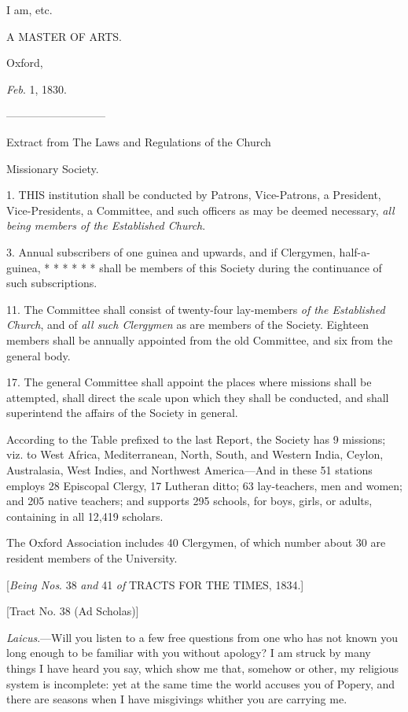 I am, etc.

A MASTER OF
ARTS.

Oxford,

\emph{Feb}. 1, 1830.

—————————

Extract from The Laws and Regulations of the
Church

Missionary Society.

1. THIS
institution shall be conducted by Patrons, Vice-Patrons, a President,
Vice-Presidents, a Committee, and such officers as may be deemed
necessary, \emph{all being members of the Established Church}.

3. Annual subscribers of one guinea and upwards,
and if Clergymen, half-a-guinea, * *
*
*
*
* shall be members of this Society during the continuance of such
subscriptions.

11. The Committee shall consist of twenty-four
lay-members \emph{of the Established Church}, and of \emph{all such
Clergymen} as are members of the Society. Eighteen members shall be
annually appointed from the old Committee, and six from the general
body.

17. The general Committee shall appoint the
places where missions shall be attempted, shall direct the scale upon
which they shall be conducted, and shall superintend the affairs
of the Society in general.

According to the Table prefixed to the last
Report, the Society has 9 missions; viz. to West Africa,
Mediterranean, North, South, and Western India, Ceylon, Australasia,
West Indies, and Northwest America—And in these 51 stations employs
28 Episcopal Clergy, 17 Lutheran ditto; 63 lay-teachers, men and
women; and 205 native teachers; and supports 295 schools, for boys,
girls, or adults, containing in all 12,419 scholars.

The Oxford Association includes 40 Clergymen, of
which number about 30 are resident members of the University.


[\emph{Being
Nos}. 38 \emph{and} 41 \emph{of} TRACTS
FOR THE
TIMES, 1834.]

[Tract No. 38 (Ad Scholas)]


\emph{Laicus}.—Will you listen to a few
free questions from one who has not known you long enough to be
familiar with you without apology? I am struck by many things I have
heard you say, which show me that, somehow or other, my religious
system is incomplete: yet at the same time the world accuses you of
Popery, and there are seasons when I have misgivings whither you are
carrying me.

